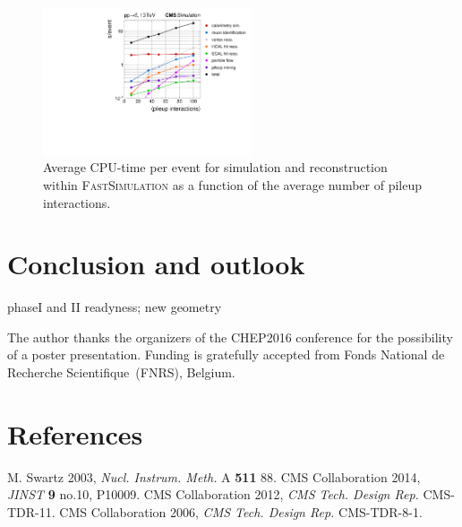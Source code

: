 \documentclass[a4paper]{jpconf}
\begin{document}
\begin{figure}[htbp]
\begin{center}
\includegraphics[width=0.55\textwidth]{figures/cpu_profile.pdf}
\caption{Average CPU-time per event for simulation and reconstruction within \textsc{FastSimulation} as a function of the average number of pileup interactions.}
\end{center}
\end{figure}

\section{Conclusion and outlook}

phaseI and II readyness; new geometry

\ack
The author thanks the organizers of the \textsc{CHEP2016} conference for the possibility of a poster presentation. Funding is gratefully accepted from Fonds National de Recherche Scientifique~(FNRS), Belgium.


\section{References}
\begin{thebibliography}{99}
 M. Swartz 2003, {\it Nucl. Instrum. Meth.} A \textbf{511} 88.
 CMS Collaboration 2014, {\it JINST} \textbf{9} no.10, P10009.
 CMS Collaboration 2012, {\it CMS Tech. Design Rep.} CMS-TDR-11.
 CMS Collaboration 2006, {\it CMS Tech. Design Rep.} CMS-TDR-8-1.

\end{thebibliography}
\end{document}
